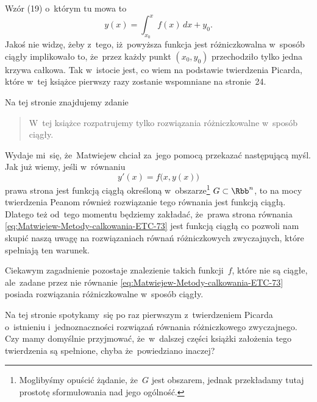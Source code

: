 \documentclass[a4paper,11pt]{article}
\numberwithin{equation}{section}
\begin{document}
\noindent
Wzór (19) o~którym tu mowa to
\begin{equation}
  \label{eq:Uwagi-do-konkrentych-stron-53}
  y( x ) =
  \int_{ x_{ 0 } }^{ x } f( x ) \, dx + y_{ 0 }.
\end{equation}
Jakoś nie widzę, żeby z~tego, iż~powyższa funkcja jest różniczkowalna
w~sposób ciągły implikowało to, że~przez każdy punkt $( x_{ 0 }, y_{ 0 } )$
przechodziło tylko jedna krzywa całkowa. Tak w~istocie jest, co wiem na
podstawie twierdzenia Picarda, które w~tej książce pierwszy razy zostanie
wspomniane na stronie~24.

\VerSpaceFour





\noindent
{} Na tej stronie znajdujemy zdanie


\begin{quote}

  W~tej książce rozpatrujemy tylko rozwiązania różniczkowalne w~sposób
  ciągły.

\end{quote}


\noindent
Wydaje mi~się, że~Matwiejew chciał za~jego pomocą przekazać następującą
myśl. Jak już wiemy, jeśli w~równaniu
\begin{equation}
  \label{eq:Uwagi-do-konkrentych-stron-54}
  y'( x ) = f\big( x, y( x ) \big)
\end{equation}
prawa strona jest funkcją ciągłą określoną w~obszarze\footnote{Moglibyśmy
  opuścić żądanie, że~$G$ jest obszarem, jednak przekładamy tutaj
  prostotę sformułowania nad jego ogólność.}
$G \subset \Rbb^{ n }$, to na mocy twierdzenia Peanom również rozwiązanie tego
równania jest funkcją ciągłą. Dlatego też od~tego momentu będziemy
zakładać, że~prawa strona równania
\eqref{eq:Matwiejew-Metody-calkowania-ETC-73} jest funkcją ciągłą
co pozwoli nam skupić naszą uwagę na rozwiązaniach równań różniczkowych
zwyczajnych, które spełniają ten warunek.

Ciekawym zagadnienie pozostaje znalezienie takich funkcji~$f$, które
nie są ciągłe, ale~zadane przez nie równanie
\eqref{eq:Matwiejew-Metody-calkowania-ETC-73} posiada rozwiązania
różniczkowalne w~sposób ciągły.

\VerSpaceFour





\noindent
{} Na tej stronie spotykamy~się po raz pierwszym z~twierdzeniem
Picarda o~istnieniu i~jednoznaczności rozwiązań równania różniczkowego
zwyczajnego. Czy mamy domyślnie przyjmować, że~w~dalszej części książki
założenia tego twierdzenia są spełnione, chyba że~powiedziano inaczej?
\end{document}

